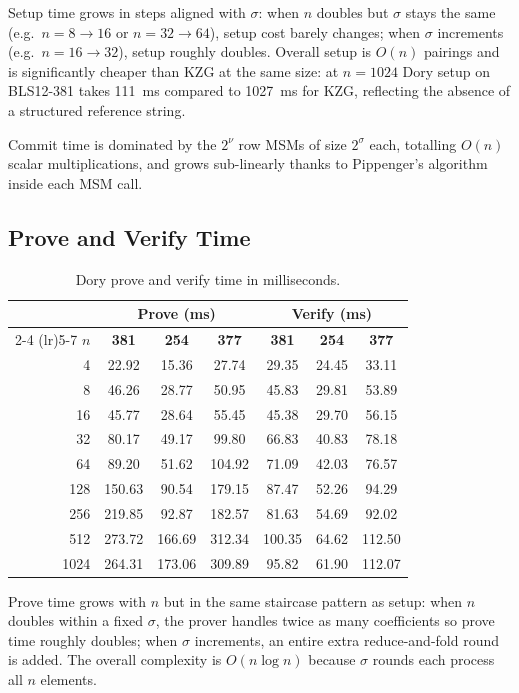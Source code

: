 Setup time grows in steps aligned with $\sigma$: when $n$ doubles but
$\sigma$ stays the same (e.g.\ $n = 8 \to 16$ or $n = 32 \to 64$), setup
cost barely changes; when $\sigma$ increments (e.g.\ $n = 16 \to 32$),
setup roughly doubles. Overall setup is $O(n)$ pairings and is significantly
cheaper than KZG at the same size: at $n = 1024$ Dory setup on BLS12-381
takes 111~ms compared to 1027~ms for KZG, reflecting the absence of a
structured reference string.

Commit time is dominated by the $2^\nu$ row MSMs of size $2^\sigma$ each,
totalling $O(n)$ scalar multiplications, and grows sub-linearly thanks to
Pippenger's algorithm inside each MSM call.

\subsection{Prove and Verify Time}

\begin{table}[H]
\centering
\caption{Dory prove and verify time in milliseconds.}
\label{tab:dory-prove-verify}
\begin{tabular}{rcccccc}
\toprule
& \multicolumn{3}{c}{\textbf{Prove (ms)}} & \multicolumn{3}{c}{\textbf{Verify (ms)}} \\
\cmidrule(lr){2-4} \cmidrule(lr){5-7}
$n$ & \textbf{381} & \textbf{254} & \textbf{377}
    & \textbf{381} & \textbf{254} & \textbf{377} \\
\midrule
4    & 22.92  & 15.36  & 27.74  & 29.35  & 24.45 & 33.11 \\
8    & 46.26  & 28.77  & 50.95  & 45.83  & 29.81 & 53.89 \\
16   & 45.77  & 28.64  & 55.45  & 45.38  & 29.70 & 56.15 \\
32   & 80.17  & 49.17  & 99.80  & 66.83  & 40.83 & 78.18 \\
64   & 89.20  & 51.62  & 104.92 & 71.09  & 42.03 & 76.57 \\
128  & 150.63 & 90.54  & 179.15 & 87.47  & 52.26 & 94.29 \\
256  & 219.85 & 92.87  & 182.57 & 81.63  & 54.69 & 92.02 \\
512  & 273.72 & 166.69 & 312.34 & 100.35 & 64.62 & 112.50 \\
1024 & 264.31 & 173.06 & 309.89 & 95.82  & 61.90 & 112.07 \\
\bottomrule
\end{tabular}
\end{table}

Prove time grows with $n$ but in the same staircase pattern as setup: when
$n$ doubles within a fixed $\sigma$, the prover handles twice as many
coefficients so prove time roughly doubles; when $\sigma$ increments, an
entire extra reduce-and-fold round is added. The overall complexity is
$O(n\log n)$ because $\sigma$ rounds each process all $n$ elements.

